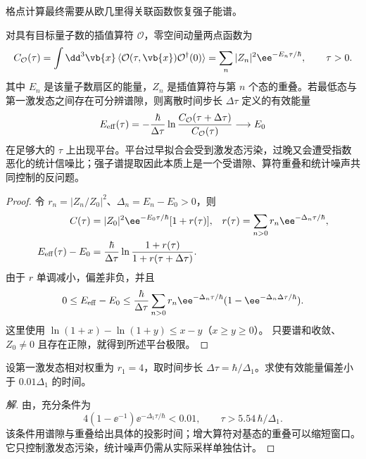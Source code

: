 格点计算最终需要从欧几里得关联函数恢复强子能谱。

\begin{proposition}[欧氏关联函数的基态投影]
对具有目标量子数的插值算符 $\mathcal O$，零空间动量两点函数为
\begin{equation}
 {
 C_{\mathcal O}(\tau)
 =\int\dd^3 \vb{x}\,
 \langle\mathcal O(\tau,\vb{x})\mathcal O^\dagger(0)\rangle
 =\sum_n |Z_n|^2\ee^{-E_n\tau/\hbar},
 \qquad \tau>0.}
 \label{eq:qcd-euclidean-correlator-spectrum-dp31}
\end{equation}
其中 $E_n$ 是该量子数扇区的能量，$Z_n$ 是插值算符与第 $n$ 个态的重叠。若最低态与第一激发态之间存在可分辨谱隙，则离散时间步长 $\Delta\tau$ 定义的有效能量
\begin{equation}
 {
 E_{\rm eff}(\tau)
 =-\frac{\hbar}{\Delta\tau}
 \ln\frac{C_{\mathcal O}(\tau+\Delta\tau)}{C_{\mathcal O}(\tau)}
 \longrightarrow E_0}
 \label{eq:qcd-euclidean-effective-energy-dp31}
\end{equation}
在足够大的 $\tau$ 上出现平台。平台过早拟合会受到激发态污染，过晚又会遭受指数恶化的统计信噪比；强子谱提取因此本质上是一个受谱隙、算符重叠和统计噪声共同控制的反问题。
\end{proposition}

\begin{proof}
令 $r_n=|Z_n/Z_0|^2$、$\Delta_n=E_n-E_0>0$，则
\begin{align*}
C(\tau)&=|Z_0|^2\ee^{-E_0\tau/\hbar}[1+r(\tau)],
&r(\tau)&=\sum_{n>0}r_n\ee^{-\Delta_n\tau/\hbar},\\
E_{\rm eff}(\tau)-E_0
&=\frac{\hbar}{\Delta\tau}
\ln\frac{1+r(\tau)}{1+r(\tau+\Delta\tau)}.
\end{align*}
由于 $r$ 单调减小，偏差非负，并且
\begin{equation}
0\le E_{\rm eff}-E_0
\le\frac{\hbar}{\Delta\tau}
\sum_{n>0}r_n\ee^{-\Delta_n\tau/\hbar}
(1-\ee^{-\Delta_n\Delta\tau/\hbar}).
\label{eq:qcd-effective-energy-bias-bound-dp126}
\end{equation}
这里使用 $\ln(1+x)-\ln(1+y)\le x-y$（$x\ge y\ge0$）。
只要谱和收敛、$Z_0\ne0$ 且存在正隙，就得到所述平台极限。
\end{proof}

\begin{example}[两态关联函数所需的投影时间]
设第一激发态相对权重为 $r_1=4$，取时间步长
$\Delta\tau=\hbar/\Delta_1$。求使有效能量偏差小于 $0.01\Delta_1$ 的时间。
\end{example}
\begin{proof}[解]
由，充分条件为
\begin{equation*}
4(1-\ee^{-1})\ee^{-\Delta_1\tau/\hbar}<0.01,
\qquad \tau>5.54\,\hbar/\Delta_1.
\end{equation*}
该条件用谱隙与重叠给出具体的投影时间；增大算符对基态的重叠可以缩短窗口。
它只控制激发态污染，统计噪声仍需从实际采样单独估计。
\end{proof}

